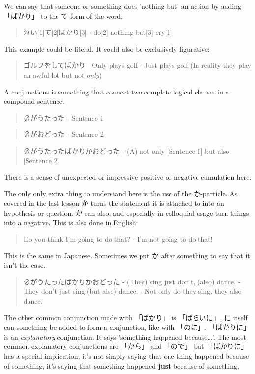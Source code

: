 \documentclass[11pt]{article}
\begin{document}
We can say that someone or something does 'nothing but' an action by adding 「ばかり」 to the て-form of the word.
\begin{quote}
泣い[1]て[2]ばかり[3] - do[2] nothing but[3] cry[1]
\end{quote}
This example could be literal. It could also be exclusively figurative:
\begin{quote}
ゴルフをしてばかり - Only plays golf - Just plays golf (In reality they play an awful lot but not \emph{only})
\end{quote}

A conjunctions is something that connect two complete logical clauses in a compound sentence.
\begin{quote}
∅がうたった - Sentence 1
\end{quote}
\begin{quote}
∅がおどった - Sentence 2
\end{quote}
\begin{quote}
∅がうたったばかりかおどった - (A) not only [Sentence 1] but also [Sentence 2]
\end{quote}
There is a sense of unexpected or impressive positive or negative cumulation here.

The only only extra thing to understand here is the use of the か-particle. As covered in the last lesson か turns the statement it is attached to into an hypothesis or question. か can also, and especially in colloquial usage turn things into a negative. This is also done in English:
\begin{quote}
Do you think I'm going to do that? - I'm not going to do that!
\end{quote}
This is the same in Japanese. Sometimes we put か after something to say that it isn't the case.
\begin{quote}
∅がうたったばかりかおどった - (They) sing just don't, (also) dance. - They don't just sing (but also) dance. - Not only do they sing, they also dance.
\end{quote}

The other common conjunction made with 「ばかり」 is 「ばらいに」. に itself can something be added to form a conjunction, like with 「のに」. 「ばかりに」 is an \emph{explanatory} conjunction. It says 'something happened because\ldots{}'. The most common explanatory conjunctions are 「から」 and 「ので」 but 「ばかりに」 has a special implication, it's not simply saying that one thing happened because of something, it's saying that something happened \textbf{just} because of something.
\end{document}
